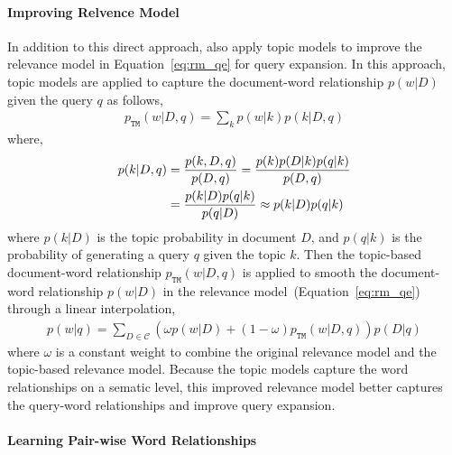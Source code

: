 \paragraph{Improving Relvence Model}

In addition to this direct approach, \cite{Yi-2009} also apply topic models to improve the relevance model in Equation~\ref{eq:rm_qe} for query expansion. In this approach, topic models are applied to capture the document-word relationship $p(w|D)$ given the query $q$ as follows,
\begin{align}
p_{\texttt{TM}}(w|D,q) = \sum_k p(w|k) p(k|D,q)
\end{align}
where,
\begin{align}
p(k|D,q) &= \frac{p(k,D,q)}{p(D,q)}  = \frac{p(k)p(D|k)p(q|k)}{p(D,q)} \\
&= \frac{p(k|D)p(q|k)}{p(q|D)} \approx p(k|D)p(q|k) \notag
\end{align}
where $p(k|D)$ is the topic probability in document $D$, and $p(q|k)$ is the probability of generating a query $q$ given the topic $k$. Then the topic-based document-word relationship $p_{\texttt{TM}}(w|D,q)$ is applied to smooth the document-word relationship $p(w|D)$ in the relevance model~(Equation~\ref{eq:rm_qe}) through a linear interpolation,
\begin{align}
p(w|q) = \sum_{D \in \mathcal{C}} (\omega p(w|D) + (1 - \omega)p_{\texttt{TM}}(w|D,q))p(D|q)
\end{align}
where $\omega$ is a constant weight to combine the original relevance model and the topic-based relevance model. Because the topic models capture the word relationships on a sematic level, this improved relevance model better captures the query-word relationships and improve query expansion. 

\paragraph{Learning Pair-wise Word Relationships}

